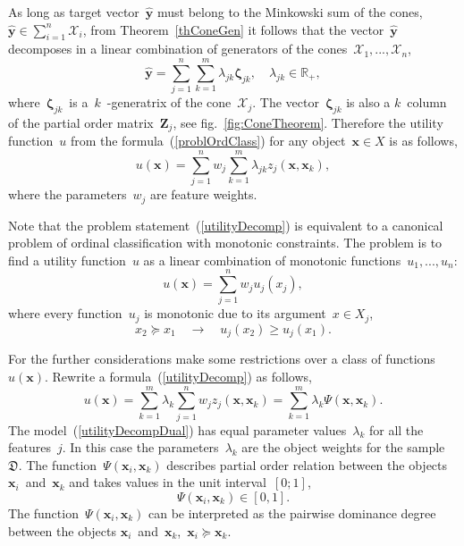 \documentclass[12pt,preprint]{elsarticle}
\newcommand{\bx}{\mathbf{x}}
\newcommand{\by}{\mathbf{y}}
\newcommand{\bZ}{\mathbf{Z}}
\newcommand{\bzeta}{\boldsymbol{\zeta}}
\begin{document}
As long as target vector~$\hat{\by}$ must belong to the Minkowski sum of the cones,~$\hat{\by}\in \sum\limits_{i=1}^n\mathcal{X}_i$, from Theorem~\ref{thConeGen} it follows that the vector~$\hat{\by}$ decomposes in a linear combination of generators of the cones~$\mathcal{X}_1,...,\mathcal{X}_n$,
\[
\hat{\by}=\sum\limits_{j=1}^n\sum\limits_{k=1}^m\lambda_{jk}\bzeta_{jk},\quad \lambda_{jk}\in\mathbb{R}_+,
\]
where~$\bzeta_{jk}$~is a~$k$~-generatrix of the cone~$\mathcal{X}_j$. The vector~$\bzeta_{jk}$ is also a $k$~column of the partial order matrix~$\bZ_j$, see fig.~\ref{fig:ConeTheorem}.
Therefore the utility function~$u$ from the formula~(\ref{problOrdClass}) for any object~$\bx\in X$ is as follows,
\begin{equation}
u(\bx) = \sum\limits_{j=1}^n w_j \sum\limits_{k=1}^m\lambda_{jk}z_j(\bx, \bx_k),
\label{utilityDecomp}
\end{equation}
where the parameters~$w_j$ are feature weights.

Note that the problem statement~(\ref{utilityDecomp}) is equivalent to a canonical problem of ordinal classification with monotonic constraints. The problem is to find a utility function~$u$ as a linear combination of monotonic functions~$u_1,...,u_n$:
\begin{equation}
u(\bx)=\sum\limits_{j=1}^n w_j u_j(x_j),
\label{problLinearMon}
\end{equation}
where every function~$u_j$ is monotonic due to its argument~$x\in X_j$,
\begin{equation}
x_2 \succeq x_1 \quad\rightarrow\quad u_j(x_2) \geq u_j(x_1).
\label{condMon}
\end{equation}

For the further considerations make some restrictions over a class of functions~$u(\bx)$.
Rewrite a formula~(\ref{utilityDecomp}) as follows,
\begin{equation}
u(\bx) = \sum\limits_{k=1}^m \lambda_{k} \sum\limits_{j=1}^n w_j z_j(\bx, \bx_k) = \sum\limits_{k=1}^m \lambda_{k} \Psi(\bx, \bx_k).
\label{utilityDecompDual}
\end{equation}
The model~(\ref{utilityDecompDual}) has equal parameter values~$\lambda_k$ for all the features~$j$. In this case the parameters~$\lambda_k$ are the object weights for the sample~$\mathfrak{D}$.
The function~$\Psi(\bx_i, \bx_k)$ describes partial order relation between the objects~$\bx_i$~and~$\bx_k$ and takes values in the unit interval~$[0;1]$,
\[
\Psi(\bx_i, \bx_k)\in[0,1].
\]
The function~$\Psi(\bx_i, \bx_k)$ can be interpreted as the pairwise dominance degree between the objects $\bx_i$~and~$\bx_k$,~$\bx_i\succeq\bx_k$.
\end{document}
